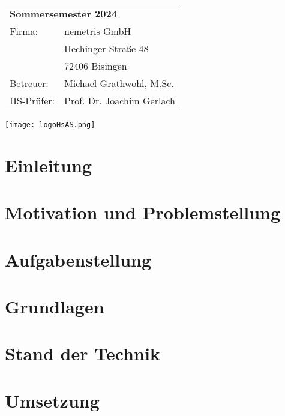 \documentclass[
	ngerman,
	a4paper,
	twoside
]{scrbook}
\begin{document}
\begin{titlepage}
	\maketitle
	\begin{tabular}{ ll }
		\multicolumn{2}{l}{\textbf{Sommersemester 2024}} \\
		Firma: &  nemetris GmbH\\
	   	& Hechinger Straße 48\\
		& 72406 Bisingen\\
		Betreuer: & Michael Grathwohl, M.Sc.\\
		HS-Prüfer: & Prof. Dr. Joachim Gerlach
	\end{tabular}
	\vspace{0.5cm}
	\begin{flushright}
    	\texttt{[image: logoHsAS.png]}
	\end{flushright}	
\end{titlepage}




	\tableofcontents
	\listoffigures
	\listoftables
	\ifdeutsch
	\else
	\fi
	\printacronyms	

\chapter{Einleitung}
	
	
\chapter{Motivation und Problemstellung}	

	
	
\chapter{Aufgabenstellung}



\chapter{Grundlagen}



\chapter{Stand der Technik}



\chapter{Umsetzung}













	\printbibliography
\end{document}
